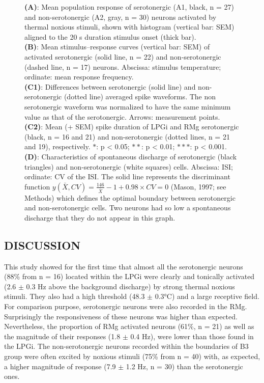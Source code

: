 \documentclass[a4paper,12pt,twoside]{report}
\begin{document}
\begin{figure}[p]
{\protect\parbox[t]{18cm}{
\begin{scriptsize}
\textbf{(A)}: Mean population response of serotonergic (A1, black, n = 27) and non-serotonergic (A2, gray, n = 30) neurons activated by thermal noxious stimuli, shown with histogram (vertical bar: SEM) aligned to the 20 s duration stimulus onset (thick bar).\\ 
\textbf{(B)}: Mean stimulus–response curves (vertical bar: SEM) of activated serotonergic (solid line, n = 22) and non-serotonergic (dashed line, n = 17) neurons. Abscissa: stimulus temperature; ordinate: mean response frequency.\\ 
\textbf{(C1)}: Differences between serotonergic (solid line) and non-serotonergic (dotted line) averaged spike waveforms. The non serotonergic waveform was normalized to have the same minimum value as that of the serotonergic. Arrows: measurement points.\\ 
\textbf{(C2)}: Mean (+ SEM) spike duration of LPGi and RMg serotonergic (black, n = 16 and 21) and non-serotonergic (dotted lines, n = 21 and 19), respectively. $*$: p < 0.05; $**$: p < 0.01; $***$: p < 0.001.\\ 
\textbf{(D)}: Characteristics of spontaneous discharge of serotonergic (black triangles) and non-serotonergic (white squares) cells. 
Abscissa: ISI; ordinate: CV of the ISI. The solid line represents the discriminant function $y(\bar{X},CV)=\frac{146}{\bar{X}}-1+0.98\times CV=0$ (Mason, 1997; see Methods) which defines the optimal boundary between serotonergic and non-serotonergic cells. Two neurons had so low a spontaneous discharge that they do not appear in this graph.
\end{scriptsize}}}

\label{Article3-FIG6}

\end{figure}

\subsection{DISCUSSION}

This study showed for the first time that almost all the serotonergic neurons (88\% from n = 16) located within the LPGi were clearly and tonically activated (2.6 $\pm$ 0.3 Hz above the background discharge) by strong thermal noxious stimuli. They also had a high threshold (48.3 $\pm$ 0.3°C) and a large receptive field.
For comparison purpose, serotonergic neurons were also recorded in the RMg. Surprisingly the responsiveness of these neurons was higher than expected. Nevertheless, the proportion of RMg activated neurons (61\%, n = 21) as well as the magnitude of their responses (1.8 $\pm$ 0.4 Hz), were lower than those found in the LPGi. The non-serotonergic neurons recorded within the boundaries of B3 group were often excited by noxious stimuli (75\% from n = 40) with, as expected, a higher magnitude of response (7.9 $\pm$ 1.2 Hz, n = 30) than the serotonergic ones.
\end{document}
